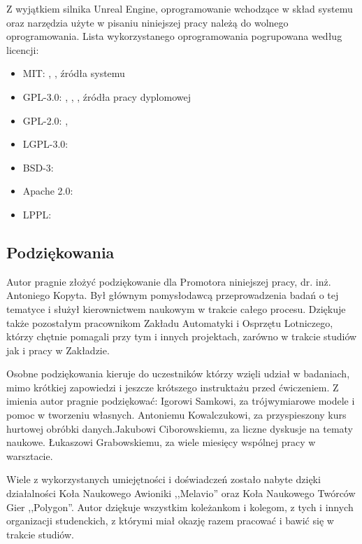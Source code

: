 Z wyjątkiem silnika Unreal Engine\cite{soft:ue4}, oprogramowanie wchodzące w skład systemu oraz narzędzia użyte w pisaniu niniejszej pracy należą do wolnego oprogramowania. Lista wykorzystanego oprogramowania pogrupowana według licencji:
\begin{itemize}
    \item MIT: \cite{soft:vuepress}, \cite{soft:vscode}, źródła systemu
    \item GPL-3.0: \cite{soft:sitl}, \cite{soft:blender}, \cite{soft:wutthesis}, źródła pracy dyplomowej
    \item GPL-2.0: \cite{soft:git}, \cite{soft:tortoisesvn}
    \item LGPL-3.0: \cite{soft:mavlink}
    \item BSD-3: \cite{soft:pandas}
    \item Apache 2.0: \cite{soft:svn}
    \item LPPL: \cite{soft:latex}
\end{itemize}

\subsection{Podziękowania}
Autor pragnie złożyć podziękowanie dla Promotora niniejszej pracy, dr. inż. Antoniego Kopyta. Był głównym pomysłodawcą przeprowadzenia badań o tej tematyce i służył kierownictwem naukowym w trakcie całego procesu. Dziękuje także pozostałym pracownikom Zakładu Automatyki i Osprzętu Lotniczego, którzy chętnie pomagali przy tym i innych projektach, zarówno w trakcie studiów jak i pracy w Zakładzie.

Osobne podziękowania kieruje do uczestników którzy wzięli udział w badaniach, mimo krótkiej zapowiedzi i jeszcze krótszego instruktażu przed ćwiczeniem. Z imienia autor pragnie podziękować: Igorowi Samkowi, za trójwymiarowe modele i pomoc w tworzeniu własnych. Antoniemu Kowalczukowi, za przyspieszony kurs hurtowej obróbki danych.Jakubowi Ciborowskiemu, za liczne dyskusje na tematy naukowe. Łukaszowi Grabowskiemu, za wiele miesięcy wspólnej pracy w warsztacie.

Wiele z wykorzystanych umiejętności i doświadczeń zostało nabyte dzięki działalności Koła Naukowego Awioniki ,,Melavio'' oraz Koła Naukowego Twórców Gier ,,Polygon''. Autor dziękuje wszystkim koleżankom i kolegom, z tych i innych organizacji studenckich, z którymi miał okazję razem pracować i bawić się w trakcie studiów.
